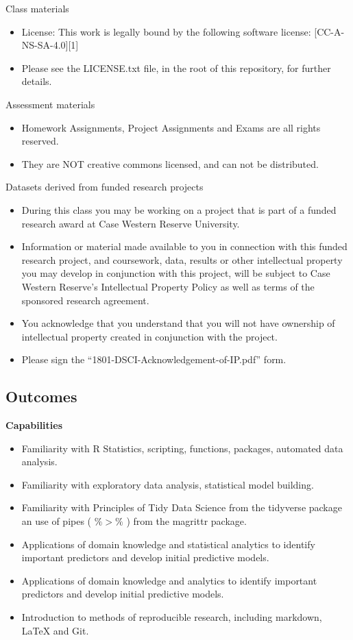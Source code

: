 \documentclass[11pt]{article} %
\begin{document}
    Class materials
    \begin{itemize}
      \item License: This work is legally bound by the following software license: [CC-A-NS-SA-4.0][1]  
      \item Please see the LICENSE.txt file, in the root of this repository, for further details. 
    \end{itemize}
    
    Assessment materials
    \begin{itemize}
      \item Homework Assignments, Project Assignments and Exams are all rights reserved. 
      \item They are NOT creative commons licensed, and can not be distributed. 
    \end{itemize}
    
    Datasets derived from funded research projects
    \begin{itemize}
      \item During this class you may be working on a project that is part of a funded research award at Case Western Reserve University.  
      \item Information or material made available to you in connection with this funded research project, and coursework, data, results or other intellectual property you may develop in conjunction with this project, will be subject to Case Western Reserve’s Intellectual Property Policy as well as terms of the sponsored research agreement.  
      \item You acknowledge that you understand that you will not have ownership of intellectual property created in conjunction with the project. 
      \item Please sign the ``1801-DSCI-Acknowledgement-of-IP.pdf'' form. 
    \end{itemize}

  \subsection{Outcomes}

    {\bf Capabilities}
    \begin{itemize}
    	\item Familiarity with R Statistics, scripting, functions, packages, automated data analysis. 
    	\item Familiarity with exploratory data analysis, statistical model building. 
        \item Familiarity with Principles of Tidy Data Science from the tidyverse package an use of pipes ( $\%>\%$ ) from the magrittr package. 
    	\item Applications of domain knowledge and statistical analytics to identify important predictors and develop initial predictive models. 
    	\item Applications of domain knowledge and analytics to identify important predictors and develop initial predictive models. 
    	\item Introduction to methods of reproducible research, including markdown, LaTeX and Git. 
    \end{itemize}
    
\end{document}
